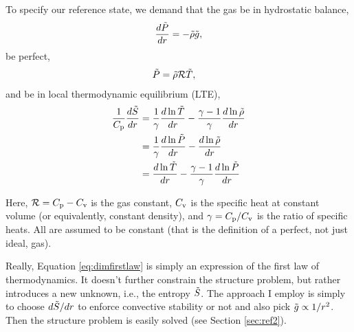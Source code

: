 \documentclass[12pt]{article}
\numberwithin{equation}{section}
\begin{document}
	To specify our reference state, we demand that the gas be in hydrostatic balance,
	\begin{align}\label{eq:dimhydro}
	\frac{d\tilde{P}}{dr}= -\tilde{\rho} \tilde{g},
	\end{align}
	be perfect,
	\begin{align}
	\tilde{P} &= \tilde{\rho}\mathcal{R} \tilde{T},\label{eq:dimidgas}
	\end{align}
	and be in local thermodynamic equilibrium (LTE), 
	\begin{subequations}\label{eq:dimfirstlaw}
	\begin{align}
		\frac{1}{C_{\rm{p}}}\frac{d\tilde{S}}{dr}&=\frac{1}{\gamma}\frac{d\ln\tilde{T}}{dr} - \frac{\gamma - 1}{\gamma}\frac{d\ln\tilde{\rho}}{dr}\label{eq:dimfirstlawtmprho}\\
		&=\frac{1}{\gamma}\frac{d\ln\tilde{P}}{dr} - \frac{d\ln\tilde{\rho}}{dr}\label{eq:dimfirstlawprsrho}\\
		&= \frac{d\ln\tilde{T}}{dr} - \frac{\gamma - 1}{\gamma}\frac{d\ln\tilde{P}}{dr}\label{eq:dimfirstlawtmpprs}
	\end{align}
	\label{eq:firstlaw3}
\end{subequations}

Here, $\mathcal{R}=C_{\rm{p}}-C_{\rm{v}}$ is the gas constant, $C_{\rm{v}}$ is the specific heat at constant volume (or equivalently, constant density), and $\gamma=C_{\rm{p}}/C_{\rm{v}}$ is the ratio of specific heats. All are assumed to be constant (that is the definition of a perfect, not just ideal, gas). 

Really, Equation \eqref{eq:dimfirstlaw} is simply an expression of the first law of thermodynamics. It doesn't further constrain the structure problem, but rather introduces a new unknown, i.e., the entropy $\tilde{S}$. The approach I employ is simply to choose $d\tilde{S}/dr$ to enforce convective stability or not and also pick $\tilde{g}\propto1/r^2$. Then the structure problem is easily solved (see Section \ref{sec:ref2}). 
\end{document}
